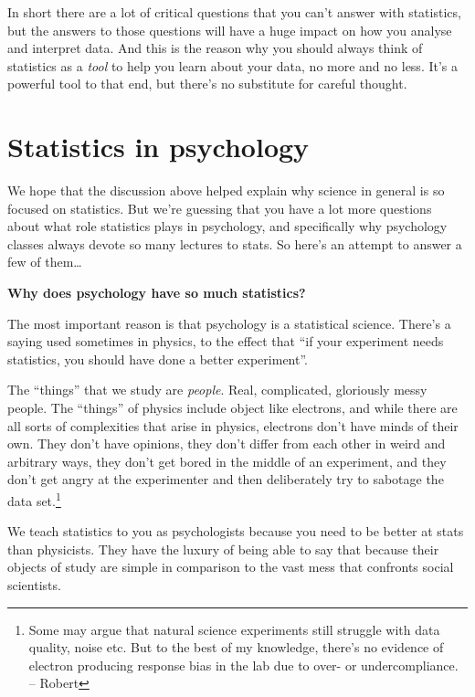 \documentclass[
  11pt,
]{book}
\theoremstyle{definition}
\theoremstyle{definition}
\theoremstyle{definition}
\theoremstyle{definition}
\theoremstyle{remark}
\begin{document}
In short there are a lot of critical questions that you can't answer with statistics, but the answers to those questions will have a huge impact on how you analyse and interpret data. And this is the reason why you should always think of statistics as a \emph{tool} to help you learn about your data, no more and no less. It's a powerful tool to that end, but there's no substitute for careful thought.

\hypertarget{statistics-in-psychology}{%
\section{Statistics in psychology}\label{statistics-in-psychology}}

We hope that the discussion above helped explain why science in general is so focused on statistics. But we're guessing that you have a lot more questions about what role statistics plays in psychology, and specifically why psychology classes always devote so many lectures to stats. So here's an attempt to answer a few of them\ldots{}

\textbf{Why does psychology have so much statistics?}

\nopagebreak[4]

The most important reason is that psychology is a statistical science. There's a saying used sometimes in physics, to the effect that ``if your experiment needs statistics, you should have done a better experiment''.

The ``things'' that we study are \emph{people}. Real, complicated, gloriously messy people. The ``things'' of physics include object like electrons, and while there are all sorts of complexities that arise in physics, electrons don't have minds of their own. They don't have opinions, they don't differ from each other in weird and arbitrary ways, they don't get bored in the middle of an experiment, and they don't get angry at the experimenter and then deliberately try to sabotage the data set.\footnote{Some may argue that natural science experiments still struggle with data quality, noise etc. But to the best of my knowledge, there's no evidence of electron producing response bias in the lab due to over- or undercompliance. -- Robert}

We teach statistics to you as psychologists because you need to be better at stats than physicists. They have the luxury of being able to say that because their objects of study are simple in comparison to the vast mess that confronts social scientists.
\end{document}
